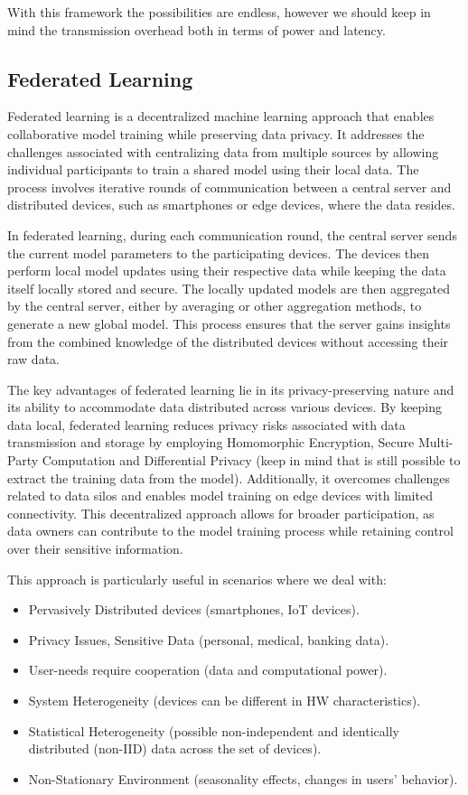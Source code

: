 \documentclass{article}
\begin{document}
      With this framework the possibilities are endless, however we should keep in mind the transmission overhead both in terms of power and latency.
    \subsection{Federated Learning}
    Federated learning is a decentralized machine learning approach that enables collaborative model training while preserving data privacy. It addresses the challenges associated with centralizing data from multiple sources by allowing individual participants to train a shared model using their local data. The process involves iterative rounds of communication between a central server and distributed devices, such as smartphones or edge devices, where the data resides.
    
    In federated learning, during each communication round, the central server sends the current model parameters to the participating devices. The devices then perform local model updates using their respective data while keeping the data itself locally stored and secure. The locally updated models are then aggregated by the central server, either by averaging or other aggregation methods, to generate a new global model. This process ensures that the server gains insights from the combined knowledge of the distributed devices without accessing their raw data.
    
    The key advantages of federated learning lie in its privacy-preserving nature and its ability to accommodate data distributed across various devices. By keeping data local, federated learning reduces privacy risks associated with data transmission and storage by employing Homomorphic Encryption, Secure
    Multi-Party Computation and Differential Privacy (keep in mind that is still possible to extract the training data from the model). Additionally, it overcomes challenges related to data silos and enables model training on edge devices with limited connectivity. This decentralized approach allows for broader participation, as data owners can contribute to the model training process while retaining control over their sensitive information.
    
    This approach is particularly useful in scenarios where we deal with:
    \begin{itemize}
      \item Pervasively Distributed devices (smartphones, IoT devices).
      \item Privacy Issues, Sensitive Data (personal, medical, banking data).
      \item User-needs require cooperation (data and computational power).
      \item System Heterogeneity (devices can be different in HW characteristics).
      \item Statistical Heterogeneity (possible non-independent and identically distributed (non-IID) data across the set of devices).
      \item Non-Stationary Environment (seasonality effects, changes in users’ behavior).
    \end{itemize}
\end{document}

